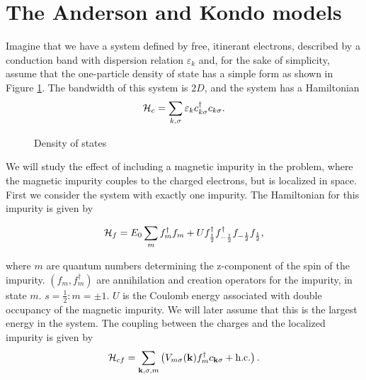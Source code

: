 \section[Magnetic impurities]{The Anderson and Kondo models}


Imagine that we have a system defined by free, itinerant electrons, described by a conduction band with dispersion relation $\varepsilon_k$ and, for the sake of simplicity, assume that the one-particle density of state has a simple form as shown in Figure \ref{fig:dos}. The bandwidth of this system is $2D$, and the system has a Hamiltonian
\begin{equation}
	\label{eq:hamiltonian_free}
	\mathcal{H}_c = \sum_{k, \sigma}\varepsilon_k c_{k\sigma}^\dagger c_{k\sigma}.
\end{equation}

\begin{figure}[h]
	\centering
	
	\caption{Density of states}
	\label{fig:dos}
\end{figure}

We will study the effect of including a magnetic impurity in the problem, where the magnetic impurity couples to the charged electrons, but is localized in space. First we consider the system with exactly one impurity. The Hamiltonian for this impurity is given by

\begin{equation}
\label{eq:hf}
	\mathcal{H}_f = E_0\sum_m f_m^\dagger f_m + U f_{\frac{1}{2}}^\dagger f_{-\frac{1}{2}}^\dagger f_{-\frac{1}{2}}f_{\frac{1}{2}},
\end{equation}

where $m$ are quantum numbers determining the z-component of the spin of the impurity. $(f_m, f_m^\dagger)$ are annihilation and creation operators for the impurity, in state $m$. $s = \frac{1}{2}: m = \pm 1$. $U$ is the Coulomb energy associated with double occupancy of the magnetic impurity. We will later assume that this is the largest energy in the system. The coupling between the charges and the localized impurity is given by
\begin{equation}
	\label{eq:interaction_term}
	\mathcal{H}_{cf}= \sum_{\vb k,\sigma,m}\left(V_{m\sigma}(\vb{k}) f_m^\dagger c_{\vb k\sigma}  + \text{h.c.}\right).
\end{equation}

